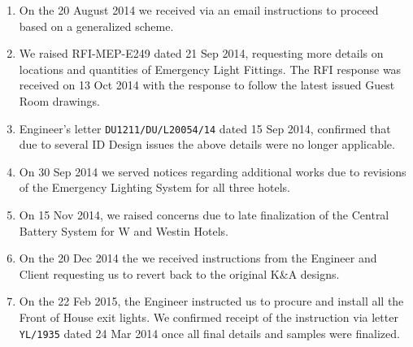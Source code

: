 \begin{enumerate}
\item On the 20 August 2014 we received via an email instructions to proceed based on a generalized scheme.
\item We raised RFI-MEP-E249 dated 21 Sep 2014, requesting more details on locations and quantities of Emergency Light Fittings. The RFI response was received on 13 Oct 2014 with the response to follow the latest issued Guest Room drawings. 
\item Engineer’s letter \texttt{DU1211/DU/L20054/14} dated 15 Sep 2014, confirmed that due to several ID Design issues the above details were no longer applicable.
\item On 30 Sep 2014 we served notices regarding additional works due to revisions of the Emergency Lighting System for all three hotels.
\item On 15 Nov 2014, we raised concerns due to late finalization of the Central Battery System for W and Westin Hotels. 
\item On the 20 Dec 2014 the we received instructions from the Engineer and Client requesting us to revert back to the original K\&A designs.
\item On the 22 Feb 2015, the Engineer instructed us to procure and install all the Front of House exit lights. We confirmed receipt of the instruction via letter \texttt{YL/1935} dated 24 Mar 2014 once all final details and samples were finalized.
\end{enumerate}


















